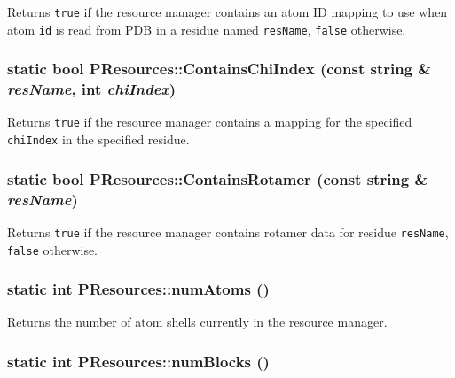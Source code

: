 Returns {\tt true} if the resource manager contains an atom ID mapping to use when atom {\tt id} is read from PDB in a residue named {\tt res\-Name}, {\tt false} otherwise. 
\subsubsection{\setlength{\rightskip}{0pt plus 5cm}static bool PResources::Contains\-Chi\-Index (const string \& {\em res\-Name}, int {\em chi\-Index})\hspace{0.3cm}{\tt  [inline, static]}}\label{classPResources_c7f35adee58157b0439ce1d132e23b00}


Returns {\tt true} if the resource manager contains a mapping for the specified {\tt chi\-Index} in the specified residue. 
\subsubsection{\setlength{\rightskip}{0pt plus 5cm}static bool PResources::Contains\-Rotamer (const string \& {\em res\-Name})\hspace{0.3cm}{\tt  [inline, static]}}\label{classPResources_7008ec7e8eb2c63e8fe837ad83bfbfcf}


Returns {\tt true} if the resource manager contains rotamer data for residue {\tt res\-Name}, {\tt false} otherwise. 
\subsubsection{\setlength{\rightskip}{0pt plus 5cm}static int PResources::num\-Atoms ()\hspace{0.3cm}{\tt  [inline, static]}}\label{classPResources_cd0c51c23a8aacf52bf5b6af863c3159}


Returns the number of atom shells currently in the resource manager. 
\subsubsection{\setlength{\rightskip}{0pt plus 5cm}static int PResources::num\-Blocks ()\hspace{0.3cm}{\tt  [inline, static]}}\label{classPResources_65e7320cab0779455b0b7ef082847774}


